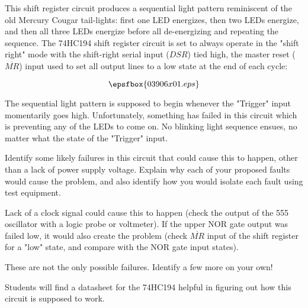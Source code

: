 

This shift register circuit produces a sequential light pattern reminiscent of the old Mercury Cougar tail-lights: first one LED energizes, then two LEDs energize, and then all three LEDs energize before all de-energizing and repeating the sequence.  The 74HC194 shift register circuit is set to always operate in the "shift right" mode with the shift-right serial input ($DSR$) tied high, the master reset ($\overline{MR}$) input used to set all output lines to a low state at the end of each cycle:

$$\epsfbox{03906x01.eps}$$

The sequential light pattern is supposed to begin whenever the "Trigger" input momentarily goes high.  Unfortunately, something has failed in this circuit which is preventing any of the LEDs to come on.  No blinking light sequence ensues, no matter what the state of the "Trigger" input.

Identify some likely failures in this circuit that could cause this to happen, other than a lack of power supply voltage.  Explain why each of your proposed faults would cause the problem, and also identify how you would isolate each fault using test equipment.







Lack of a clock signal could cause this to happen (check the output of the 555 oscillator with a logic probe or voltmeter).  If the upper NOR gate output was failed low, it would also create the problem (check $\overline{MR}$ input of the shift register for a "low" state, and compare with the NOR gate input states).

These are not the only possible failures.  Identify a few more on your own!







Students will find a datasheet for the 74HC194 helpful in figuring out how this circuit is supposed to work.





